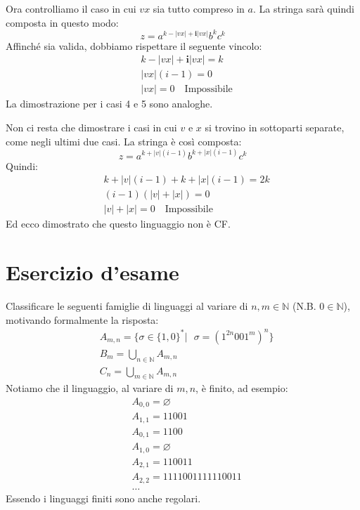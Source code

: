\documentclass[a4paper,oneside]{scrbook}
\begin{document}
Ora controlliamo il caso in cui $vx$ sia tutto compreso in $a$. La stringa sarà quindi composta in questo modo:
\begin{equation*}
	z=a^{k-|vx|+\textbf{i}|vx|}b^kc^k
\end{equation*}
Affinché sia valida, dobbiamo rispettare il seguente vincolo:
\begin{align*}
	&k-|vx|+\textbf{i}|vx|=k\\
	&|vx|(i-1)=0\\
	&|vx|=0 \quad \text{Impossibile}
\end{align*}
La dimostrazione per i casi 4 e 5 sono analoghe.

Non ci resta che dimostrare i casi in cui $v$ e $x$ si trovino in sottoparti separate, come negli ultimi due casi.
La stringa è così composta:
\begin{equation*}
	z=a^{k+|v|(i-1)}b^{k+|x|(i-1)}c^k
\end{equation*}
Quindi:
\begin{align*}
	&k+|v|(i-1)+k+|x|(i-1)=2k\\
	&(i-1)(|v|+|x|)=0\\
	&|v|+|x|=0 \quad \text{Impossibile}
\end{align*}
Ed ecco dimostrato che questo linguaggio non è CF.

\chapter{Esercizio d'esame}
Classificare le seguenti famiglie di linguaggi al variare di $n,m \in \mathbb{N}$ (N.B. $0\in\mathbb{N}$), motivando formalmente la risposta:
\begin{align*}
	&A_{m,n} =\{ \sigma \in \{1,0\}^* | \text{ } \sigma = (1^{2n}001^m)^n \}\\
	&B_m = \bigcup_{n\in\mathbb{N}} A_{m,n}\\
	&C_n = \bigcup_{m\in\mathbb{N}} A_{m,n}
\end{align*}
Notiamo che il linguaggio, al variare di $m,n$, è finito, ad esempio:
\begin{align*}
	&A_{0,0}=\varnothing\\
	&A_{1,1}=11001\\
	&A_{0,1}=1100\\
	&A_{1,0}=\varnothing\\
	&A_{2,1}=110011\\
	&A_{2,2}=1111001111110011\\
	&\dots
\end{align*}
Essendo i linguaggi finiti sono anche regolari.
\end{document}
